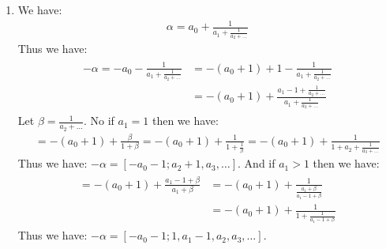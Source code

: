 \begin{enumerate}[label=]
    \item
        We have:
        \begin{gather*}
            \alpha = a_0 + \frac{1}{a_1 + \frac{1}{a_2 + \dots}}
        \end{gather*}
        Thus we have:
        \begin{gather*}
            \begin{split}
                -\alpha = -a_0 - \frac{1}{a_1 + \frac{1}{a_2 + \dots}} & = -(a_0 + 1) + 1 - \frac{1}{a_1 + \frac{1}{a_2 + \dots}} \\
                & = -(a_0 + 1) + \frac{a_1 - 1 + \frac{1}{a_2 + \dots}}{a_1 + \frac{1}{a_2 + \dots}}
            \end{split}
        \end{gather*}
        Let $\beta = \frac{1}{a_2 + \dots}$. No if $a_1 = 1$ then we have:
        \begin{gather*}
            = -(a_0 + 1) + \frac{\beta}{1 + \beta} = -(a_0 + 1) + \frac{1}{1 + \frac{1}{\beta}} = -(a_0 + 1) + \frac{1}{1 + a_2 + \frac{1}{a_3 + \dots}}
        \end{gather*}
        Thus we have: $-\alpha = [-a_0 - 1; a_2 + 1, a_3, \dots]$. And if $a_1 > 1$ then we have:
        \begin{gather*}
            \begin{split}
                = -(a_0 + 1) + \frac{a_1 - 1 + \beta}{a_1 + \beta} & = -(a_0 + 1) + \frac{1}{\frac{a_1 + \beta}{a_1 - 1 + \beta}} \\
                & = -(a_0 + 1) + \frac{1}{1 + \frac{1}{a_1 - 1 + \beta}}
            \end{split}
        \end{gather*}
        Thus we have: $-\alpha = [-a_0 - 1; 1, a_1 - 1, a_2, a_3, \dots]$.
\end{enumerate}